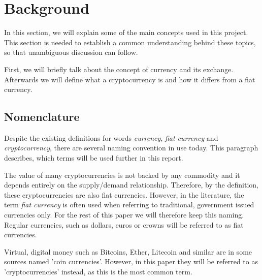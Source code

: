 \section{Background}
% 
In this section, we will explain some of the main concepts used in this project. This section is needed to establish a common understanding behind these topics, so that unambiguous discussion can follow.

First, we will briefly talk about the concept of currency and its exchange. Afterwards we will define what a cryptocurrency is and how it differs from a fiat currency. 
% 

% 

% 

% 

% 



\subsection{Nomenclature}
Despite the existing definitions for words \textit{currency}, \textit{fiat currency} and \textit{cryptocurrency}, there are several naming convention in use today. This paragraph describes, which terms will be used further in this report.

The value of many cryptocurrencies is not backed by any commodity and it depends entirely on the supply/demand relationship. Therefore, by the definition, these cryptocurrencies are also fiat currencies. However, in the literature, the term \emph{fiat currency} is often used when referring to traditional, government issued currencies only. For the rest of this paper we will therefore keep this naming. Regular currencies, such as dollars, euros or crowns will be referred to as fiat currencies.

Virtual, digital money such as Bitcoins, Ether, Litecoin and similar are in some sources named 'coin currencies'. However, in this paper they will be referred to as 'cryptocurrencies' instead, as this is the most common term.